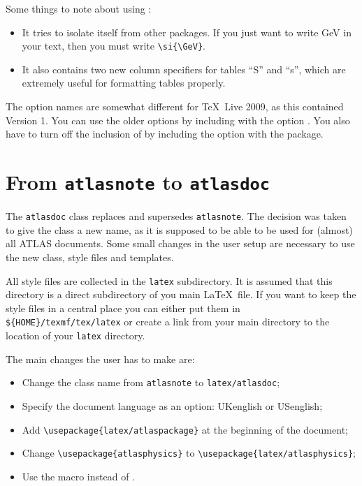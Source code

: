 Some things to note about using :
\begin{itemize}
\item It tries to isolate itself from other packages.
  If you just want to write \si{\GeV} in your text,
  then you must write \verb|\si{\GeV}|.
\item It also contains two new column specifiers for tables ``S'' and ``s'',
  which are extremely useful for formatting tables properly.
\end{itemize}

The option names are somewhat different for \TeX\ Live 2009,
as this contained  Version 1.
You can use the older options by including  with the 
option .
You also have to turn off the inclusion of  by including the option  with
the  package.


\section{From \texttt{atlasnote} to \texttt{atlasdoc}}
\label{sec:oldnote}

The \texttt{atlasdoc} class replaces and supersedes \texttt{atlasnote}.
The decision was taken to give the class a new name, as it is supposed to be
able to be used for (almost) all ATLAS documents.
Some small changes in the user setup are necessary to use the new
class, style files and templates.

All style files are collected in the \texttt{latex} subdirectory.
It is assumed that this directory is a direct subdirectory of you main \LaTeX\ file.
If you want to keep the style files in a central place you can either put them in
\verb|${HOME}/texmf/tex/latex| or create a link from your main directory to the location of
your \texttt{latex} directory.

The main changes the user has to make are:
\begin{itemize}
\item Change the class name from \texttt{atlasnote} to \texttt{latex/atlasdoc};
\item Specify the document language as an option: UKenglish or USenglish;
\item Add \verb|\usepackage{latex/atlaspackage}| at the beginning of the document;
\item Change \verb|\usepackage{atlasphysics}| to \verb|\usepackage{latex/atlasphysics}|; 
\item Use the macro  instead of .
\end{itemize}

